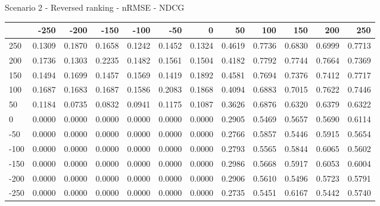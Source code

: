 Scenario 2 - Reversed ranking - nRMSE - NDCG
\begin{tabular}{lrrrrrrrrrrr}
\toprule
{} &   -250 &   -200 &   -150 &   -100 &   -50  &    0   &    50  &    100 &    150 &    200 &    250 \\
\midrule
 250 & 0.1309 & 0.1870 & 0.1658 & 0.1242 & 0.1452 & 0.1324 & 0.4619 & 0.7736 & 0.6830 & 0.6999 & 0.7713 \\
 200 & 0.1736 & 0.1303 & 0.2235 & 0.1482 & 0.1561 & 0.1504 & 0.4182 & 0.7792 & 0.7744 & 0.7664 & 0.7369 \\
 150 & 0.1494 & 0.1699 & 0.1457 & 0.1569 & 0.1419 & 0.1892 & 0.4581 & 0.7694 & 0.7376 & 0.7412 & 0.7717 \\
 100 & 0.1687 & 0.1683 & 0.1687 & 0.1586 & 0.2083 & 0.1868 & 0.4094 & 0.6883 & 0.7015 & 0.7622 & 0.7446 \\
 50  & 0.1184 & 0.0735 & 0.0832 & 0.0941 & 0.1175 & 0.1087 & 0.3626 & 0.6876 & 0.6320 & 0.6379 & 0.6322 \\
 0   & 0.0000 & 0.0000 & 0.0000 & 0.0000 & 0.0000 & 0.0000 & 0.2905 & 0.5469 & 0.5657 & 0.5690 & 0.6114 \\
-50  & 0.0000 & 0.0000 & 0.0000 & 0.0000 & 0.0000 & 0.0000 & 0.2766 & 0.5857 & 0.5446 & 0.5915 & 0.5654 \\
-100 & 0.0000 & 0.0000 & 0.0000 & 0.0000 & 0.0000 & 0.0000 & 0.2793 & 0.5565 & 0.5844 & 0.6065 & 0.5602 \\
-150 & 0.0000 & 0.0000 & 0.0000 & 0.0000 & 0.0000 & 0.0000 & 0.2986 & 0.5668 & 0.5917 & 0.6053 & 0.6004 \\
-200 & 0.0000 & 0.0000 & 0.0000 & 0.0000 & 0.0000 & 0.0000 & 0.2906 & 0.5610 & 0.5496 & 0.5723 & 0.5791 \\
-250 & 0.0000 & 0.0000 & 0.0000 & 0.0000 & 0.0000 & 0.0000 & 0.2735 & 0.5451 & 0.6167 & 0.5442 & 0.5740 \\
\bottomrule
\end{tabular}

